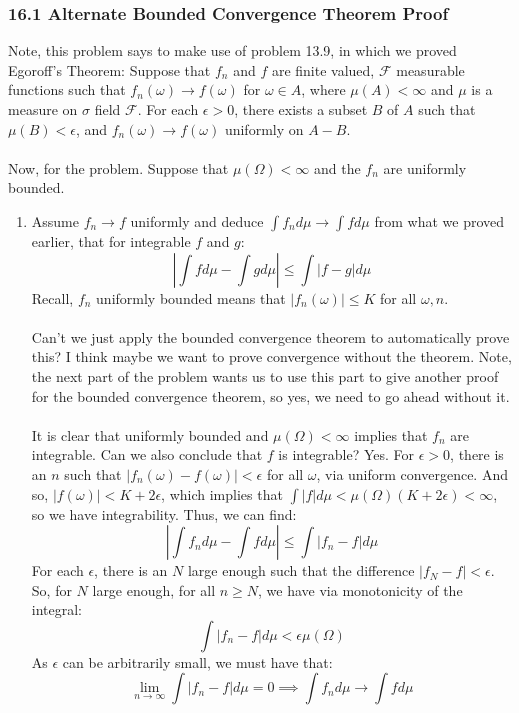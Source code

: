 \documentclass[12pt,a4paper]{article}
\newcommand{\1}[1]{\mathbbm{1}\left\{ #1 \right\}}
\newcommand{\fcal}{\mathcal{F}}
\begin{document}
\subsubsection{16.1 Alternate Bounded Convergence Theorem Proof} Note, this problem says to make use of problem 13.9, in which we proved Egoroff's Theorem: Suppose that $f_n$ and $f$ are finite valued, $\fcal$ measurable functions such that $f_n(\omega) \to f(\omega)$ for $\omega \in A$, where $\mu(A) < \infty$ and $\mu$ is a measure on $\sigma$ field $\fcal$. For each $\epsilon > 0$, there exists a subset $B$ of $A$ such that $\mu(B) < \epsilon$, and $f_n(\omega) \to f(\omega)$ uniformly on $A - B$.
\\\\
Now, for the problem. Suppose that $\mu(\Omega) < \infty$ and the $f_n$ are uniformly bounded.
\begin{enumerate}
	\item Assume $f_n \to f$ uniformly and deduce $\int f_n d\mu \to \int f d\mu$ from what we proved earlier, that for integrable $f$ and $g$:
	$$
		\left|\int f d\mu - \int g d\mu\right| \leq \int |f - g| d\mu
	$$
	Recall, $f_n$ uniformly bounded means that $|f_n(\omega)| \leq K$ for all $\omega, n$. 
	\\\\
	Can't we just apply the bounded convergence theorem to automatically prove this? I think maybe we want to prove convergence without the theorem. Note, the next part of the problem wants us to use this part to give another proof for the bounded convergence theorem, so yes, we need to go ahead without it.
	\\\\
	It is clear that uniformly bounded and $\mu(\Omega) < \infty$ implies that $f_n$ are integrable. Can we also conclude that $f$ is integrable? Yes. For $\epsilon > 0$, there is an $n$ such that $|f_n(\omega) - f(\omega)| < \epsilon$ for all $\omega$, via uniform convergence. And so, $|f(\omega)| < K + 2\epsilon$, which implies that $\int |f| d\mu < \mu(\Omega)(K + 2\epsilon) < \infty$, so we have integrability. Thus, we can find:
	$$
		\left|\int f_n d\mu - \int f d\mu\right| \leq \int |f_n - f| d\mu
	$$
	For each $\epsilon$, there is an $N$ large enough such that the difference $|f_N - f| < \epsilon$. So, for $N$ large enough, for all $n \geq N$, we have via monotonicity of the integral:
	$$
		\int |f_n - f| d\mu < \epsilon \mu(\Omega)
	$$
	As $\epsilon$ can be arbitrarily small, we must have that:
	$$
		\lim_{n \to \infty} \int |f_n -f| d\mu = 0 \implies
		\int f_n d\mu \to \int f d\mu
	$$
	

\end{enumerate}
\end{document}

